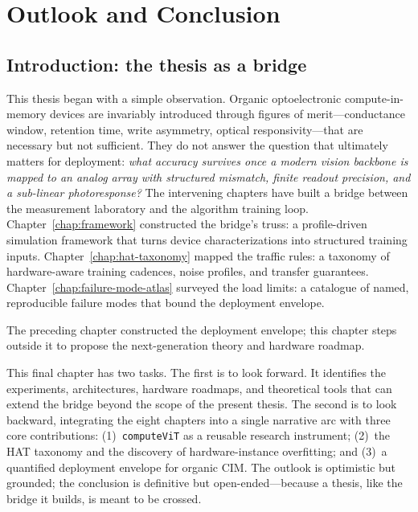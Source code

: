 %

\chapter{Outlook and Conclusion}
\label{chap:outlook}

\section{Introduction: the thesis as a bridge}

This thesis began with a simple observation.  Organic optoelectronic compute-in-memory devices are invariably introduced through figures of merit---conductance window, retention time, write asymmetry, optical responsivity---that are necessary but not sufficient.  They do not answer the question that ultimately matters for deployment: \emph{what accuracy survives once a modern vision backbone is mapped to an analog array with structured mismatch, finite readout precision, and a sub-linear photoresponse?}  The intervening chapters have built a bridge between the measurement laboratory and the algorithm training loop.  Chapter~\ref{chap:framework} constructed the bridge's truss: a profile-driven simulation framework that turns device characterizations into structured training inputs.  Chapter~\ref{chap:hat-taxonomy} mapped the traffic rules: a taxonomy of hardware-aware training cadences, noise profiles, and transfer guarantees.  Chapter~\ref{chap:failure-mode-atlas} surveyed the load limits: a catalogue of named, reproducible failure modes that bound the deployment envelope.

The preceding chapter constructed the deployment envelope; this chapter steps outside it to propose the next-generation theory and hardware roadmap.

This final chapter has two tasks.  The first is to look forward.  It identifies the experiments, architectures, hardware roadmaps, and theoretical tools that can extend the bridge beyond the scope of the present thesis.  The second is to look backward, integrating the eight chapters into a single narrative arc with three core contributions: (1)~\texttt{compute\-ViT} as a reusable research instrument; (2)~the HAT taxonomy and the discovery of hardware-instance overfitting; and (3)~a quantified deployment envelope for organic CIM.  The outlook is optimistic but grounded; the conclusion is definitive but open-ended---because a thesis, like the bridge it builds, is meant to be crossed.



